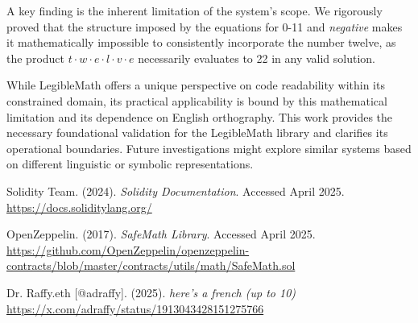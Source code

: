 \documentclass[12pt,a4paper]{article}
\theoremstyle{plain}
\theoremstyle{definition}
\begin{document}
A key finding is the inherent limitation of the system's scope. We rigorously proved that the structure imposed by the equations for 0-11 and \emph{negative} makes it mathematically impossible to consistently incorporate the number twelve, as the product $t \cdot w \cdot e \cdot l \cdot v \cdot e$ necessarily evaluates to 22 in any valid solution.

While LegibleMath offers a unique perspective on code readability within its constrained domain, its practical applicability is bound by this mathematical limitation and its dependence on English orthography. This work provides the necessary foundational validation for the LegibleMath library and clarifies its operational boundaries. Future investigations might explore similar systems based on different linguistic or symbolic representations.

 \begin{thebibliography}{9}
    Solidity Team. (2024). \textit{Solidity Documentation}. Accessed April 2025. \\
    \url{https://docs.soliditylang.org/}

    OpenZeppelin. (2017). \textit{SafeMath Library}. Accessed April 2025. \\
    \url{https://github.com/OpenZeppelin/openzeppelin-contracts/blob/master/contracts/utils/math/SafeMath.sol}

    Dr. Raffy.eth [@adraffy]. (2025). \textit{here's a french (up to 10)} \\
    \url{https://x.com/adraffy/status/1913043428151275766}
 \end{thebibliography}
\end{document}
